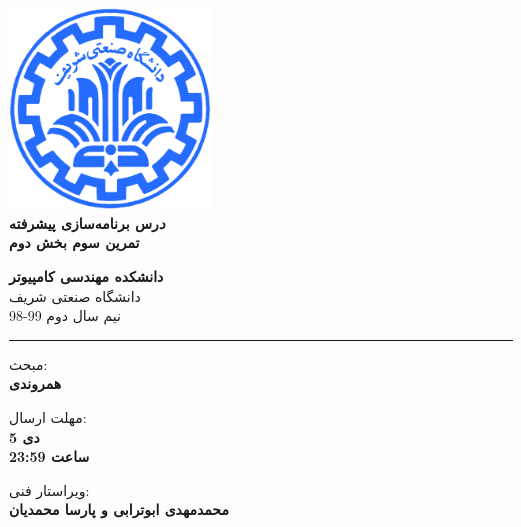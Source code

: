 \documentclass[]{article}
\begin{document}
\begin{titlepage}
\begin{center}
        
\vspace*{0.7cm}

\includegraphics[width=0.4\textwidth]{sharif1.png}\\
\vspace{0.5cm}
\textbf{ \Huge{\emph درس برنامه‌سازی پیشرفته} }\\
\vspace{0.5cm}
\textbf{ \Large{ تمرین سوم بخش دوم} }
\vspace{0.2cm}
       
 
      \large \textbf{دانشکده مهندسی کامپیوتر}\\\vspace{0.2cm}
    \large   دانشگاه صنعتی شریف\\\vspace{0.2cm}
       \large   ﻧﯿﻢ سال دوم 99-98 \\\vspace{0.2cm}
      \noindent\rule[1ex]{\linewidth}{1pt}
    مبحث:\\
    \textbf{{همروندی}}

    \vspace{0.20cm}

   مهلت ارسال:\\
    \textbf{{5 دی}}\\
    \textbf{{ساعت 23:59}}

    \vspace{0.15cm}
ویراستار فنی:\\
    \textbf{{محمدمهدی ابوترابی و پارسا محمدیان}}
\end{center}
\end{titlepage}


\newpage
\pagestyle{fancy}
\fancyhf{}
\fancyfoot{}
\cfoot{\thepage}
\end{document}
